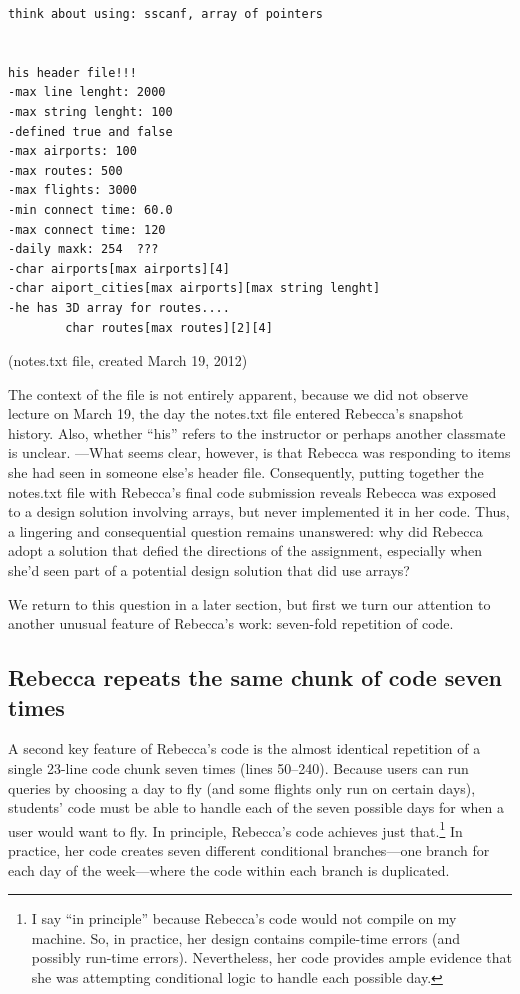 \begin{verbatim}
think about using: sscanf, array of pointers


his header file!!!
-max line lenght: 2000
-max string lenght: 100
-defined true and false
-max airports: 100
-max routes: 500
-max flights: 3000
-min connect time: 60.0
-max connect time: 120
-daily maxk: 254  ???
-char airports[max airports][4]
-char aiport_cities[max airports][max string lenght]
-he has 3D array for routes.... 
        char routes[max routes][2][4]
\end{verbatim}

(notes.txt file, created March 19, 2012)

The context of the file is not entirely apparent, because we did not observe lecture on March 19, the day the notes.txt file entered Rebecca's snapshot history. Also, whether ``his'' refers to the instructor or perhaps another classmate is unclear. ---What seems clear, however, is that Rebecca was responding to items she had seen in someone else's header file. Consequently, putting together the notes.txt file with Rebecca's final code submission reveals Rebecca was exposed to a design solution involving arrays, but never implemented it in her code. Thus, a lingering and consequential question remains unanswered: why did Rebecca adopt a solution that defied the directions of the assignment, especially when she'd seen part of a potential design solution that did use arrays?

We return to this question in a later section, but first we turn our attention to another unusual feature of Rebecca's work: seven-fold repetition of code.

\subsection{Rebecca repeats the same chunk of code seven times}\label{rebecca-repeats-the-same-chunk-of-code-seven-times}

A second key feature of Rebecca's code is the almost identical repetition of a single 23-line code chunk seven times (lines 50--240). Because users can run queries by choosing a day to fly (and some flights only run on certain days), students' code must be able to handle each of the seven possible days for when a user would want to fly. In principle, Rebecca's code achieves just that.\footnote{I say ``in principle'' because Rebecca's code would not compile on my machine. So, in practice, her design contains compile-time errors (and possibly run-time errors). Nevertheless, her code provides ample evidence that she was attempting conditional logic to handle each possible day.} In practice, her code creates seven different conditional branches---one branch for each day of the week---where the code within each branch is duplicated.

